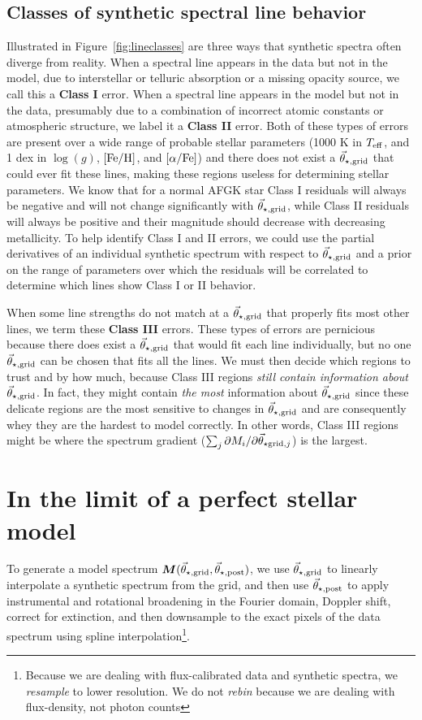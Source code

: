 \documentclass[preprint]{aastex} %
\newcommand{\vt}{\vec{\theta}}
\newcommand{\vg}{\vt_{\star, {\rm grid}}}
\newcommand{\vpp}{\vt_{\star, {\rm post}}}
\newcommand{\fM}{ {\bm M}}
\newcommand{\fMi}{M_i}
\newcommand{\Z}{[{\rm Fe}/{\rm H}]}
\newcommand{\A}{[\alpha/{\rm Fe}]}
\begin{document}
\subsection{Classes of synthetic spectral line behavior}
Illustrated in Figure~\ref{fig:lineclasses} are three ways that synthetic spectra often diverge from reality. When a spectral line appears in the data but not in the model, due to interstellar or telluric absorption or a missing opacity source, we call this a \textbf{Class I} error. When a spectral line appears in the model but not in the data, presumably due to a combination of incorrect atomic constants or atmospheric structure, we label it a \textbf{Class II} error. Both of these types of errors are present over a wide range of probable stellar parameters (1000 K in $T_{\rm eff}$, and 1 dex in $\log(g)$, $\Z$, and $\A$) and there does not exist a $\vg$ that could ever fit these lines, making these regions useless for determining stellar parameters. We know that for a normal AFGK star Class I residuals will always be negative and will not change significantly with $\vg$, while Class II residuals will always be positive and their magnitude should decrease with decreasing metallicity. To help identify Class I and II errors,  we could use the partial derivatives of an individual synthetic spectrum with respect to $\vg$ and a prior on the range of parameters over which the residuals will be correlated to determine which lines show Class I or II behavior.

When some line strengths do not match at a $\vg$ that properly fits most other lines, we term these \textbf{Class III} errors. These types of errors are pernicious because there does exist a $\vg$ that would fit each line individually, but no one $\vg$ can be chosen that fits all the lines. We must then decide which regions to trust and by how much, because Class III regions \emph{still contain information about $\vg$}. In fact, they might contain \emph{the most} information about $\vg$ since these delicate regions are the most sensitive to changes in $\vg$ and are consequently whey they are the hardest to model correctly. In other words, Class III regions might be where the spectrum gradient ($\sum_{j} \partial \fMi/ \partial \vt_{ \star {\rm grid}, j}$) is the largest. 

\section{In the limit of a perfect stellar model}
To generate a model spectrum $\fM(\vg, \vpp)$, we use $\vg$ to linearly interpolate a synthetic spectrum from the grid, and then use $\vpp$ to apply instrumental and rotational broadening in the Fourier domain, Doppler shift, correct for extinction, and then downsample to the exact pixels of the data spectrum using spline interpolation\footnote{Because we are dealing with flux-calibrated data and synthetic spectra, we \emph{resample} to lower resolution. We do not \emph{rebin} because we are dealing with flux-density, not photon counts}.
\end{document}

